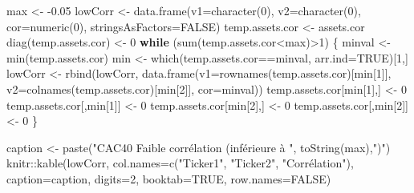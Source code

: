 \documentclass[
]{article}
\newenvironment{Shaded}{\begin{snugshade}}{\end{snugshade}}
\newcommand{\AttributeTok}[1]{\textcolor[rgb]{0.77,0.63,0.00}{#1}}
\newcommand{\ConstantTok}[1]{\textcolor[rgb]{0.00,0.00,0.00}{#1}}
\newcommand{\ControlFlowTok}[1]{\textcolor[rgb]{0.13,0.29,0.53}{\textbf{#1}}}
\newcommand{\DecValTok}[1]{\textcolor[rgb]{0.00,0.00,0.81}{#1}}
\newcommand{\FloatTok}[1]{\textcolor[rgb]{0.00,0.00,0.81}{#1}}
\newcommand{\FunctionTok}[1]{\textcolor[rgb]{0.00,0.00,0.00}{#1}}
\newcommand{\NormalTok}[1]{#1}
\newcommand{\OtherTok}[1]{\textcolor[rgb]{0.56,0.35,0.01}{#1}}
\newcommand{\SpecialCharTok}[1]{\textcolor[rgb]{0.00,0.00,0.00}{#1}}
\newcommand{\StringTok}[1]{\textcolor[rgb]{0.31,0.60,0.02}{#1}}
\begin{document}
\begin{Shaded}
\begin{Highlighting}[]
\NormalTok{max }\OtherTok{\textless{}{-}} \SpecialCharTok{{-}}\FloatTok{0.05}
\NormalTok{lowCorr }\OtherTok{\textless{}{-}} \FunctionTok{data.frame}\NormalTok{(}\AttributeTok{v1=}\FunctionTok{character}\NormalTok{(}\DecValTok{0}\NormalTok{), }\AttributeTok{v2=}\FunctionTok{character}\NormalTok{(}\DecValTok{0}\NormalTok{), }\AttributeTok{cor=}\FunctionTok{numeric}\NormalTok{(}\DecValTok{0}\NormalTok{), }
                      \AttributeTok{stringsAsFactors=}\ConstantTok{FALSE}\NormalTok{)}
\NormalTok{temp.assets.cor }\OtherTok{\textless{}{-}}\NormalTok{ assets.cor}
\FunctionTok{diag}\NormalTok{(temp.assets.cor) }\OtherTok{\textless{}{-}} \DecValTok{0}
\ControlFlowTok{while}\NormalTok{ (}\FunctionTok{sum}\NormalTok{(temp.assets.cor}\SpecialCharTok{\textless{}}\NormalTok{max)}\SpecialCharTok{\textgreater{}}\DecValTok{1}\NormalTok{) \{}
\NormalTok{  minval }\OtherTok{\textless{}{-}} \FunctionTok{min}\NormalTok{(temp.assets.cor)}
\NormalTok{  min }\OtherTok{\textless{}{-}} \FunctionTok{which}\NormalTok{(temp.assets.cor}\SpecialCharTok{==}\NormalTok{minval, }\AttributeTok{arr.ind=}\ConstantTok{TRUE}\NormalTok{)[}\DecValTok{1}\NormalTok{,]}
\NormalTok{  lowCorr }\OtherTok{\textless{}{-}} \FunctionTok{rbind}\NormalTok{(lowCorr, }\FunctionTok{data.frame}\NormalTok{(}\AttributeTok{v1=}\FunctionTok{rownames}\NormalTok{(temp.assets.cor)[min[}\DecValTok{1}\NormalTok{]], }
                                       \AttributeTok{v2=}\FunctionTok{colnames}\NormalTok{(temp.assets.cor)[min[}\DecValTok{2}\NormalTok{]], }
                                       \AttributeTok{cor=}\NormalTok{minval))}
\NormalTok{  temp.assets.cor[min[}\DecValTok{1}\NormalTok{],] }\OtherTok{\textless{}{-}} \DecValTok{0}
\NormalTok{  temp.assets.cor[,min[}\DecValTok{1}\NormalTok{]] }\OtherTok{\textless{}{-}} \DecValTok{0}
\NormalTok{  temp.assets.cor[min[}\DecValTok{2}\NormalTok{],] }\OtherTok{\textless{}{-}} \DecValTok{0}
\NormalTok{  temp.assets.cor[,min[}\DecValTok{2}\NormalTok{]] }\OtherTok{\textless{}{-}} \DecValTok{0}
\NormalTok{\}}

\NormalTok{caption }\OtherTok{\textless{}{-}} \FunctionTok{paste}\NormalTok{(}\StringTok{"CAC40 Faible corrélation (inférieure à  "}\NormalTok{, }\FunctionTok{toString}\NormalTok{(max),}\StringTok{")"}\NormalTok{)}
\NormalTok{knitr}\SpecialCharTok{::}\FunctionTok{kable}\NormalTok{(lowCorr,}
             \AttributeTok{col.names=}\FunctionTok{c}\NormalTok{(}\StringTok{"Ticker1"}\NormalTok{, }\StringTok{"Ticker2"}\NormalTok{, }\StringTok{"Corrélation"}\NormalTok{), }
             \AttributeTok{caption=}\NormalTok{caption,}
             \AttributeTok{digits=}\DecValTok{2}\NormalTok{, }\AttributeTok{booktab=}\ConstantTok{TRUE}\NormalTok{, }\AttributeTok{row.names=}\ConstantTok{FALSE}\NormalTok{)}
\end{Highlighting}
\end{Shaded}
\end{document}
